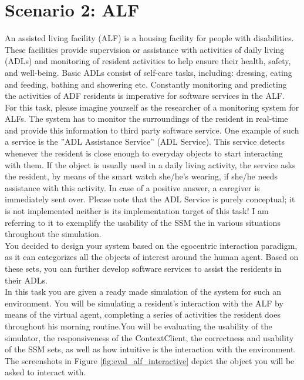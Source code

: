 \section{Scenario 2: ALF} %
\label{sec:eval_alf_scenario}
An assisted living facility (ALF) is a housing facility for people with disabilities. These facilities provide supervision or assistance with activities of daily living (ADLs) and monitoring of resident activities to help ensure their health, safety, and well-being. Basic ADLs consist of self-care tasks, including: dressing, eating and feeding, bathing and showering etc. Constantly monitoring and predicting the activities of ADF residents is imperative for software services in the ALF.\\

For this task, please imagine yourself as the researcher of a monitoring system for ALFs. The system has to monitor the surroundings of the resident in real-time and provide this information to third party software service. One example of such a service is the ''ADL Assistance Service'' (ADL Service). This service detects whenever the resident is close enough to everyday objects to start interacting with them. If the object is usually used in a daily living activity, the service asks the resident, by means of the smart watch she/he's wearing, if she/he needs assistance with this activity. In case of a positive answer, a caregiver is immediately sent over. Please note that the ADL Service is purely conceptual; it is not implemented neither is its implementation target of this task! I am referring to it to exemplify the usability of the SSM the in various situations throughout the simulation.\\

You decided to design your system based on the egocentric interaction paradigm, as it can categorizes all the objects of interest around the human agent. Based on these sets, you can further develop software services to assist the residents in their ADLs.\\

In this task you are given a ready made simulation of the system for such an environment. You will be simulating a resident's interaction with the ALF by means of the virtual agent, completing a series of activities the resident does throughout his morning routine.You will be evaluating the usability of the simulator, the responsiveness of the ContextClient, the correctness and usability of the SSM sets, as well as how intuitive is the interaction with the environment. The screenshots in Figure \ref{fig:eval_alf_interactive} depict the object you will be asked to interact with.\\

